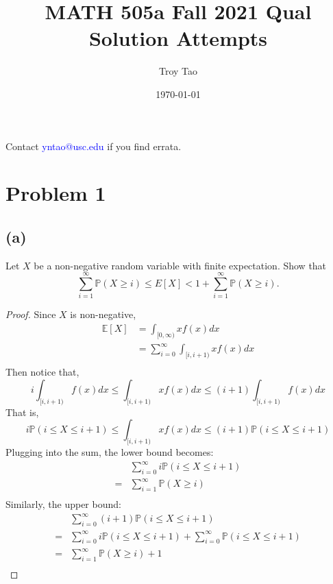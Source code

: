 \documentclass{article}
\title{MATH 505a Fall 2021 Qual Solution Attempts}
\author{Troy Tao}
\date\today
\begin{document}
\maketitle 
Contact \textcolor{blue}{yntao@usc.edu} if you find errata.



\section*{Problem 1}
\subsection*{(a)}
Let $X$ be a non-negative random variable with finite expectation. Show that
$$\sum_{i=1}^{\infty} \mathbb{P}(X\geq i) \leq E[X] < 1+\sum_{i=1}^{\infty} \mathbb{P}(X\geq i). $$
\color{blue}
\begin{proof}
    Since $X$ is non-negative,
    \begin{equation*}
        \begin{split}
            \mathbb{E}[X] & = \int_{[0,\infty)} xf(x)dx \\
                 & = \sum _{i=0}^{\infty}\int_{[i,i+1)}xf(x)dx\\
        \end{split}
    \end{equation*}
    Then notice that,
    \begin{equation*}
        i\int_{[i,i+1)}f(x)dx \leq \int_{[i,i+1)}xf(x)dx \leq (i+1)\int_{[i,i+1)}f(x)dx
    \end{equation*}
    That is,
    \begin{equation*}
        i\mathbb{P}(i \leq X \leq i+1)  \leq \int_{[i,i+1)}xf(x)dx \leq (i+1)\mathbb{P}(i \leq X \leq i+1)
    \end{equation*}
    Plugging into the sum, the lower bound becomes: 
    \begin{equation*}
        \begin{split}
            &\sum_{i=0}^\infty i\mathbb{P}(i\leq X\leq i+1) \\
            =& \sum_{i=1}^\infty \mathbb{P}(X \geq i)\\
        \end{split}
    \end{equation*}
    Similarly, the upper bound:
    \begin{equation*}
        \begin{split}
            &\sum_{i=0}^\infty (i+1)\mathbb{P}(i\leq X\leq i+1) \\
            =& \sum_{i=0}^\infty i\mathbb{P}(i\leq X\leq i+1)+\sum_{i=0}^\infty \mathbb{P}(i\leq X \leq i+1)\\
            =& \sum_{i=1}^\infty \mathbb{P}(X \geq i)+1\\
        \end{split}
    \end{equation*}
\end{proof}
\color{black}
\end{document}
